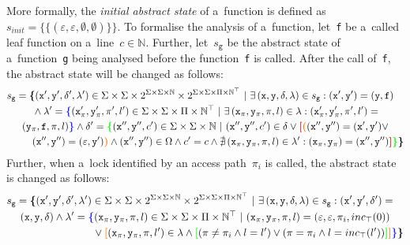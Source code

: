 More formally, the \emph{initial abstract state} of a~function is defined as $ s_{init} = \{\{(\varepsilon, \varepsilon, \emptyset, \emptyset)\}\} $. To formalise the analysis of a~function, let~\texttt{f} be a~called leaf function on a~line~$ c \in \mathbb{N} $. Further, let~$ s_\mathtt{g} $ be the abstract state of a~function~\texttt{g} being analysed before the function~\texttt{f} is called. After the call of~\texttt{f}, the abstract state will be changed as follows:
$$
\begin{multlined}
    s_\mathtt{g} = \bb{\{}(\mathtt{x}^\prime, \mathtt{y}^\prime, \delta^\prime, \lambda^\prime) \in \Sigma \times \Sigma \times 2^{\Sigma \times \Sigma \times \mathbb{N}} \times 2^{\Sigma \times \Sigma \times \Pi \times \mathbb{N}^\top}\ | \ \exists\,(\mathtt{x}, \mathtt{y}, \delta, \lambda) \in s_\mathtt{g} : (\mathtt{x}^\prime, \mathtt{y}^\prime) = (\mathtt{y}, \mathtt{f}) \\
%
    \wedge \lambda^\prime = \bA{\{}(\mathtt{x}_\pi^\prime, \mathtt{y}_\pi^\prime, \pi^\prime, l^\prime) \in \Sigma \times \Sigma \times \Pi \times \mathbb{N}^\top\  |\ \exists\,(\mathtt{x}_\pi, \mathtt{y}_\pi, \pi, l) \in \lambda : (\mathtt{x}_\pi^\prime, \mathtt{y}_\pi^\prime, \pi^\prime, l^\prime) = \\
%
    (\mathtt{y}_\pi, \mathtt{f}, \pi, l)\bA{\}} \wedge \delta^\prime = \bD{\{}(\mathtt{x}^{\prime\prime}, \mathtt{y}^{\prime\prime}, c^\prime) \in \Sigma \times \Sigma \times \mathbb{N}\ |\ (\mathtt{x}^{\prime\prime}, \mathtt{y}^{\prime\prime}, c^\prime) \in \delta \vee \bC{[}\bB{(}(\mathtt{x}^{\prime\prime}, \mathtt{y}^{\prime\prime}) = (\mathtt{x}^\prime, \mathtt{y}^\prime) \vee \\
%
    (\mathtt{x}^{\prime\prime}, \mathtt{y}^{\prime\prime}) = (\varepsilon, \mathtt{y}^\prime)\bB{)} \wedge (\mathtt{x}^{\prime\prime}, \mathtt{y}^{\prime\prime}) \in \Omega \wedge c^\prime = c \wedge \nexists\,(\mathtt{x}_\pi, \mathtt{y}_\pi, \pi, l) \in \lambda^\prime : (\mathtt{x}_\pi, \mathtt{y}_\pi) = (\mathtt{x}^{\prime\prime}, \mathtt{y}^{\prime\prime})%
%
    \bC{]}\bD{\}}\bb{\}}
\end{multlined}
$$
Further, when a~lock identified by an access path~$ \pi_i $ is called, the abstract state is changed as follows:
$$
\begin{multlined}
    s_\mathtt{g} = \bb{\{}(\mathtt{x}^\prime, \mathtt{y}^\prime, \delta^\prime, \lambda^\prime) \in \Sigma \times \Sigma \times 2^{\Sigma \times \Sigma \times \mathbb{N}} \times 2^{\Sigma \times \Sigma \times \Pi \times \mathbb{N}^\top}\ |\ \exists\,(\mathtt{x}, \mathtt{y}, \delta, \lambda) \in s_\mathtt{g} : (\mathtt{x}^\prime, \mathtt{y}^\prime, \delta^\prime) = \\
%
    (\mathtt{x}, \mathtt{y}, \delta) \wedge \lambda^\prime = \bA{\{}(\mathtt{x}_\pi, \mathtt{y}_\pi, \pi, l) \in \Sigma \times \Sigma \times \Pi \times \mathbb{N}^\top\ |\ (\mathtt{x}_\pi, \mathtt{y}_\pi, \pi, l) = (\varepsilon, \varepsilon, \pi_i, inc_\top(0)) \\
%
    \vee \bB{[}(\mathtt{x}_\pi, \mathtt{y}_\pi, \pi, l^\prime) \in \lambda \wedge \bD{[}(\pi \neq \pi_i \wedge l = l^\prime) \vee (\pi = \pi_i \wedge l = inc_\top(l^\prime))
%
    \bD{]}\bB{]}\bA{\}}\bb{\}}
\end{multlined}
$$

